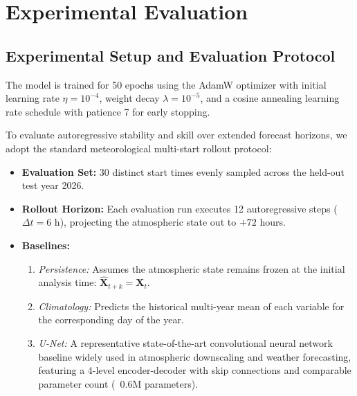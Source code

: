 \section{Experimental Evaluation}
\label{sec:exp}

\subsection{Experimental Setup and Evaluation Protocol}
The model is trained for 50 epochs using the AdamW optimizer with initial learning rate $\eta = 10^{-4}$, weight decay $\lambda = 10^{-5}$, and a cosine annealing learning rate schedule with patience 7 for early stopping. 

To evaluate autoregressive stability and skill over extended forecast horizons, we adopt the standard meteorological multi-start rollout protocol:
\begin{itemize}
    \item \textbf{Evaluation Set:} 30 distinct start times evenly sampled across the held-out test year 2026.
    \item \textbf{Rollout Horizon:} Each evaluation run executes 12 autoregressive steps ($\Delta t = 6\text{ h}$), projecting the atmospheric state out to $+72$ hours.
    \item \textbf{Baselines:} 
    \begin{enumerate}
        \item \textit{Persistence:} Assumes the atmospheric state remains frozen at the initial analysis time: $\hat{\mathbf{X}}_{t+k} = \mathbf{X}_t$.
        \item \textit{Climatology:} Predicts the historical multi-year mean of each variable for the corresponding day of the year.
        \item \textit{U-Net:} A representative state-of-the-art convolutional neural network baseline widely used in atmospheric downscaling and weather forecasting, featuring a 4-level encoder-decoder with skip connections and comparable parameter count (~0.6M parameters).
    \end{enumerate}
\end{itemize}

